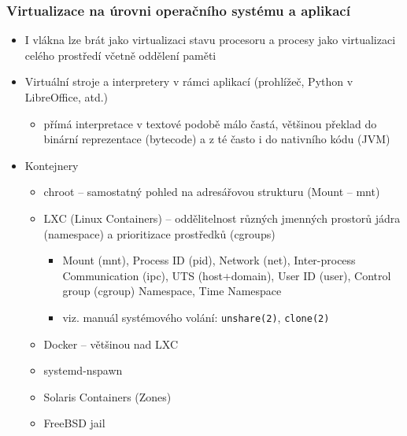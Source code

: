 \documentclass{beamer}
\begin{document}
\begin{frame}
\frametitle{Virtualizace na úrovni operačního systému a aplikací}

\begin{itemize}
 \item I vlákna lze brát jako virtualizaci stavu procesoru a procesy jako virtualizaci celého prostředí včetně oddělení paměti
 \item Virtuální stroje a interpretery v rámci aplikací (prohlížeč, Python v LibreOffice, atd.)
 \begin{itemize}
  \item přímá interpretace v textové podobě málo častá, většinou překlad do binární reprezentace (bytecode) a z té často i do nativního kódu (JVM)
 \end{itemize}
 \item Kontejnery
 \begin{itemize}
  \item chroot -- samostatný pohled na adresářovou strukturu (Mount -- mnt)
  \item LXC (Linux Containers) -- oddělitelnost různých jmenných prostorů jádra (namespace) a prioritizace prostředků (cgroups)
  \begin{itemize}
   \item Mount (mnt), Process ID (pid), Network (net), Inter-process Communication (ipc), UTS (host+domain), User ID (user), Control group (cgroup) Namespace, Time Namespace
   \item viz. manuál systémového volání: \texttt{unshare(2)}, \texttt{clone(2)}
  \end{itemize}
  \item Docker -- většinou nad LXC
  \item systemd-nspawn
  \item Solaris Containers (Zones)
  \item FreeBSD jail
 \end{itemize}
\end{itemize}
\end{frame}
\end{document}
